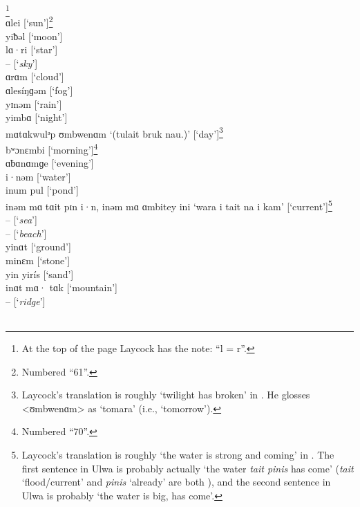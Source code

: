 \footnote{At the top of the page Laycock has the note: “l = r”.}\\

\noindent ɑlei       [‘sun’]\footnote{Numbered “61”.}\\
yiƀəl       [‘moon’]\\
lɑ·ri       [‘star’]\\
 --        [‘\textit{sky}’]\\
ɑrɑm       [‘cloud’]\\
ɑlesíŋɡəm     [‘fog’]\\
yɪnəm       [‘rain’]\\
yimbɑ       [‘night’]\\
mɑtɑkwulᵊp ʊmbwenɑm  ‘(tulait bruk nau.)’ [‘day’]\footnote{Laycock’s  translation is roughly ‘twilight has broken’ in . He glosses \mbox{<ʊmbwenɑm>} as ‘tomara’ (i.e., ‘tomorrow’).}\\
bʷɔnɛmbi    [‘morning’]\footnote{Numbered “70”.}\\
ɑƀɑnɑmɡe    [‘evening’]\\
i·nəm      [‘water’]\\
inum pul    [‘pond’]\\
inəm mɑ tɑit pɪn i·n, inəm mɑ ɑmbitey ini ‘wara i tait na i kam’ [‘current’]\footnote{Laycock’s  translation is roughly ‘the water is strong and coming’ in . The first sentence in Ulwa is probably actually ‘the water \textit{tait pinis} has come’ (\textit{tait} ‘flood/current’ and \textit{pinis} ‘already’ are both ), and the second sentence in Ulwa is probably ‘the water is big, has come’.}\\
 --        [‘\textit{sea}’]\\
 --        [‘\textit{beach}’]\\
yinɑt       [‘ground’]\\
minɛm     [‘stone’]\\
yin yirís     [‘sand’]\\
inɑt mɑ· tɑk   [‘mountain’]\\
 --        [‘\textit{ridge}’]\\
 
\\

